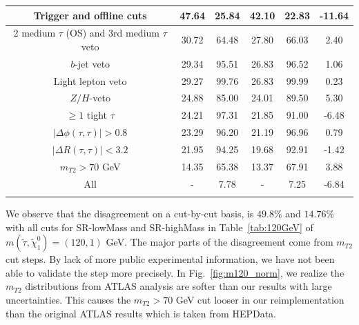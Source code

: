 \documentclass{ws-mpla}
\begin{document}
\begin{table}[h!]
{\begin{tabular}{@{}c c c c c c@{}}
Trigger and offline cuts                        &    47.64 & 25.84 &    42.10 & 22.83 & -11.64 \\ \hline
2 medium $\tau$ (OS) and 3rd medium $\tau$ veto &    30.72 & 64.48 &    27.80 & 66.03 &   2.40 \\ \hline
$b$-jet veto                                    &    29.34 & 95.51 &    26.83 & 96.52 &   1.06 \\ \hline
Light lepton veto                               &    29.27 & 99.76 &    26.83 & 99.99 &   0.23 \\ \hline
$Z/H$-veto                                      &    24.88 & 85.00 &    24.01 & 89.50 &   5.30 \\ \hline
$ \geq 1 $ tight $\tau$                         &    24.21 & 97.31 &    21.85 & 91.00 &  -6.48 \\ \hline
$ |\Delta\phi(\tau,\tau)| > 0.8 $               &    23.29 & 96.20 &    21.19 & 96.96 &   0.79 \\ \hline
$ |\Delta R(\tau,\tau)| < 3.2 $                 &    21.95 & 94.25 &    19.68 & 92.91 &  -1.42 \\ \hline
$ m_{T2} > 70 $ GeV                             &    14.35 & 65.38 &    13.37 & 67.91 &   3.88 \\ \hline
All                                             &        - &  7.78 &        - &  7.25 &  -6.84 \\ \botrule
\end{tabular}
\label{tab:280GeV} }
\end{table} 


We observe that the disagreement on a cut-by-cut basis, is $49.8\%$ and $14.76\%$ with all cuts for SR-lowMass and SR-highMass in Table~\ref{tab:120GeV} of $m(\tilde{\tau},\tilde{\chi}^0_1)=(120,1) $ GeV. The major parts of the disagreement come from $m_{T2}$ cut steps. By lack of more public experimental information, we have not been able to validate the step more precisely.
In Fig.~\ref{fig:m120_norm}, we realize the $m_{T2}$ distributions from ATLAS analysis are softer than our results with large uncertainties. This causes the $m_{T2} > 70$ GeV cut looser in our reimplementation than the original ATLAS results which is taken from HEPData\cite{hepdata}.
\end{document}
